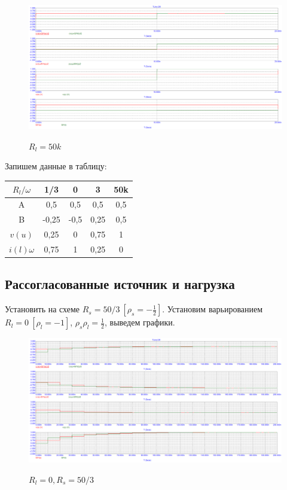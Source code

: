 \documentclass[a4paper, 12pt]{article}%
\begin{document}
\begin{figure}[h!]
\centering
\includegraphics[scale=0.4]{images/Graph7.png}
\label{fig:Image1}
\caption{$R_l = 50k$}
\end{figure}

Запишем данные в таблицу:

\begin{center}
\begin{tabular}{|c|c|c|c|c|}
\hline 
$R_l/\omega$ & 1/3 & 0 & 3 & 50k \\ 
\hline 
A & 0,5 & 0,5 & 0,5 & 0,5 \\ 
\hline 
B & -0,25 & -0,5 & 0,25 & 0,5 \\ 
\hline 
$v(u)$ & 0,25 & 0 & 0,75 & 1 \\ 
\hline 
$i(l)\omega$ & 0,75 & 1 & 0,25 & 0 \\ 
\hline 
\end{tabular} 
\end{center}

\subsection*{Рассогласованные источник и нагрузка}

Установить на схеме $R_s = 50/3 \: [\rho_s = -\frac{1}{2}]$. Установим варьированием $R_l = 0 \: [\rho_l = -1]$, $\rho_s \rho_l = \frac{1}{2}$, выведем графики.

\begin{figure}[h!]
\centering
\includegraphics[scale=0.4]{images/Graph8.png}
\label{fig:Image1}
\caption{$R_l = 0, R_s = 50/3$}
\end{figure}
\end{document}
